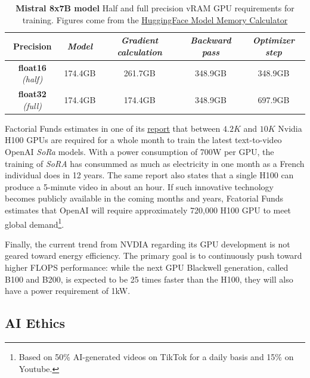 \begin{table}[htp!]
  \caption{\textbf{ Mistral 8x7B model} Half and full precision vRAM \ac{GPU} requirements for training. Figures come from the \href{https://huggingface.co/docs/accelerate/main/en/usage_guides/model_size_estimator}{HuggingFace Model Memory Calculator}}
  \label{tab:gs-mistral_requirement}
  \centering
  \begin{adjustbox}{width=\linewidth}
  \begin{tabular}[h]{c||cccc}
  \hline 
   Precision &  \textit{Model} & \textit{Gradient calculation} & \textit{Backward pass} & \textit{Optimizer step} \\
  \hline 
  \textbf{float16} \textit{(half)} & 174.4GB  & 261.7GB & 348.9GB & 348.9GB\\
  \textbf{float32} \textit{(full)} &  174.4GB  & 174.4GB & 348.9GB & 697.9GB \\
  \hline 
  \end{tabular}
  \end{adjustbox}
\end{table}
Factorial Funds estimates in one of its \href{https://www.factorialfunds.com/blog/under-the-hood-how-openai-s-sora-model-works}{report} that between $4.2K$ and $10K$ Nvidia H100 \ac{GPU}s are required for a whole month to train the latest text-to-video OpenAI \textit{SoRa} models. With a power consumption of 700W  per \ac{GPU}, the training of \textit{SoRA} has consummed as much as electricity in one month as a French individual does in 12 years. The same report also states that a single H100 can produce a 5-minute video in about an hour. If such innovative technology becomes publicly available in the coming months and years, Fcatorial Funds estimates that OpenAI will require approximately 720,000 H100 \ac{GPU} to meet global demand\footnote{Based on 50\% \ac{AI}-generated videos on TikTok for a daily basis and 15\% on Youtube.}. 

Finally, the current trend from NVDIA regarding its \ac{GPU} development is not geared toward energy efficiency. The primary goal is to continuously push toward higher FLOPS performance: while the next \ac{GPU} Blackwell generation, called B100 and B200, is expected to be 25 times faster than the H100, they will also have a power requirement of 1kW. 


\subsection{AI Ethics} 

